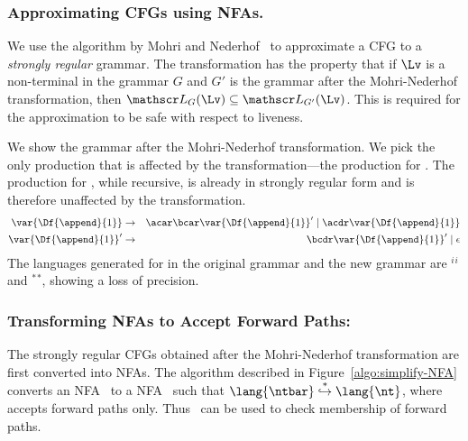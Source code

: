 \subsubsection{Approximating CFGs using NFAs.}
\label{sec:NFA-approx}

We use the   
algorithm  by  Mohri  and Nederhof~\cite{mohri00regular}   to
approximate a CFG  to a   {\em strongly regular\/} grammar.  The
transformation has  the  property that  if $\Lv$  is a
non-terminal  in the grammar  $G$ and  $G'$ is  the grammar  after the
Mohri-Nederhof transformation, then  ${\mathscr L}_G(\Lv) \subseteq {\mathscr
  L}_{G'}(\Lv)$.    This  is   required  for the
approximation to be safe with respect to liveness.

We show the  grammar after the Mohri-Nederhof
transformation. We  pick the only production that  is affected by
the transformation---the production for .  The
production for , while  recursive, is already in
strongly  regular  form  and   is  therefore  unaffected  by  the
transformation.
 \begin{eqnarray*}
  \var{\Df{\append}{1}}
  &\rightarrow&               \acar\bcar \var{\Df{\append}{1}}'  \mid
  \acdr\var{\Df{\append}{1}} \\ 
\var{\Df{\append}{1}}'  &\rightarrow&   \bcdr\var{\Df{\append}{1}}'
\mid \epsilon 
\end{eqnarray*}
The  languages
generated for   in  the original grammar  and the
new       grammar      are       \acdr$^i$\acar\bcar\bcdr$^i$      and
\acdr$^*$\acar\bcar\bcdr$^*$, showing a  loss of  precision.
 


\subsubsection{Transforming NFAs to Accept Forward Paths:}
The strongly regular CFGs obtained after the Mohri-Nederhof
transformation are
  first converted  into  NFAs.  The        algorithm         described        in
Figure~\ref{algo:simplify-NFA} converts  an NFA \ntbar\  to a NFA
\nt\ such that  $\lang{\ntbar} \stackrel{*}{\hookrightarrow} \lang{\nt}$, where {\nt} accepts forward paths only.
Thus  \nt\  can  be  used  to  check  
membership of forward paths.

